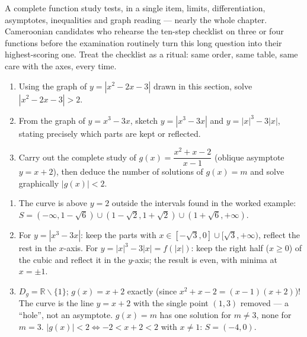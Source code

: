 \documentclass[11pt]{article}
\def\setminus{\mathbin{\backslash}}\let\smallsetminus\setminus
\begin{document}
\begin{savaistu}
A complete function study tests, in a single item, limits, differentiation, asymptotes, inequalities and graph reading --- nearly the whole chapter. Cameroonian candidates who rehearse the ten-step checklist on three or four functions before the examination routinely turn this long question into their highest-scoring one. Treat the checklist as a ritual: same order, same table, same care with the axes, every time.
\end{savaistu}

\begin{exercice}[Practice]
\begin{enumerate}
\item Using the graph of $y = |x^{2} - 2x - 3|$ drawn in this section, solve $|x^{2} - 2x - 3| > 2$.
\item From the graph of $y = x^{3} - 3x$, sketch $y = |x^{3} - 3x|$ and $y = |x|^{3} - 3|x|$, stating precisely which parts are kept or reflected.
\item Carry out the complete study of $g(x) = \dfrac{x^{2} + x - 2}{x - 1}$ (oblique asymptote $y = x + 2$), then deduce the number of solutions of $g(x) = m$ and solve graphically $|g(x)| < 2$.
\end{enumerate}
\end{exercice}

\begin{corrige}[Exercise 1]
\begin{enumerate}
\item The curve is above $y = 2$ outside the intervals found in the worked example: $S = (-\infty, 1-\sqrt{6}) \cup (1-\sqrt{2}, 1+\sqrt{2}) \cup (1+\sqrt{6}, +\infty)$.
\item For $y = |x^{3} - 3x|$: keep the parts with $x \in [-\sqrt{3}, 0] \cup [\sqrt{3}, +\infty)$, reflect the rest in the $x$-axis. For $y = |x|^{3} - 3|x| = f(|x|)$: keep the right half ($x \geq 0$) of the cubic and reflect it in the $y$-axis; the result is even, with minima at $x = \pm 1$.
\item $D_{g} = \mathbb{R}\setminus\{1\}$; $g(x) = x + 2$ exactly (since $x^{2} + x - 2 = (x-1)(x+2)$)! The curve is the line $y = x + 2$ with the single point $(1, 3)$ removed --- a ``hole'', not an asymptote. $g(x) = m$ has one solution for $m \neq 3$, none for $m = 3$. $|g(x)| < 2 \iff -2 < x + 2 < 2$ with $x \neq 1$: $S = (-4, 0)$.
\end{enumerate}
\end{corrige}
\end{document}
